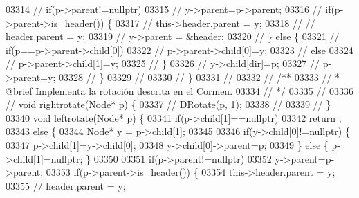 \begin{DoxyCode}
03314 \textcolor{comment}{//                if(p->parent!=nullptr)}
03315 \textcolor{comment}{//                    y->parent=p->parent;}
03316 \textcolor{comment}{//                if(p->parent->is\_header()) \{}
03317 \textcolor{comment}{//                    this->header.parent = y;}
03318 \textcolor{comment}{//                    // header.parent = y;}
03319 \textcolor{comment}{//                    y->parent = &header;}
03320 \textcolor{comment}{//                \} else \{}
03321 \textcolor{comment}{//                    if(p==p->parent->child[0])}
03322 \textcolor{comment}{//                        p->parent->child[0]=y;}
03323 \textcolor{comment}{//                    else}
03324 \textcolor{comment}{//                        p->parent->child[1]=y;}
03325 \textcolor{comment}{//                \}}
03326 \textcolor{comment}{//                y->child[dir]=p;}
03327 \textcolor{comment}{//                p->parent=y;}
03328 \textcolor{comment}{//            \}}
03329 \textcolor{comment}{//}
03330 \textcolor{comment}{//        \}}
03331 \textcolor{comment}{//}
03332 \textcolor{comment}{//        /**}
03333 \textcolor{comment}{//         * @brief Implementa la rotación descrita en el Cormen.}
03334 \textcolor{comment}{//         */}
03335 \textcolor{comment}{//}
03336 \textcolor{comment}{//        void rightrotate(Node* p) \{}
03337 \textcolor{comment}{//            DRotate(p, 1);}
03338 \textcolor{comment}{//}
03339 \textcolor{comment}{//        \}}
\hypertarget{map_8h_source.tex_l03340}{}\hyperlink{classaed2_1_1map_ad764851f1534f2db0964c4f729056a1e_ad764851f1534f2db0964c4f729056a1e}{03340}         \textcolor{keywordtype}{void} \hyperlink{classaed2_1_1map_ad764851f1534f2db0964c4f729056a1e_ad764851f1534f2db0964c4f729056a1e}{leftrotate}(Node* p) \{
03341             \textcolor{keywordflow}{if}(p->child[1]==\textcolor{keyword}{nullptr})
03342                 return ;
03343             \textcolor{keywordflow}{else} \{
03344                 Node* y = p->child[1];
03345 
03346                 \textcolor{keywordflow}{if}(y->child[0]!=\textcolor{keyword}{nullptr}) \{
03347                     p->child[1]=y->child[0];
03348                     y->child[0]->parent=p;
03349                 \} \textcolor{keywordflow}{else} \{ p->child[1]=\textcolor{keyword}{nullptr}; \}
03350 
03351                 \textcolor{keywordflow}{if}(p->parent!=\textcolor{keyword}{nullptr})
03352                     y->parent=p->parent;
03353                 \textcolor{keywordflow}{if}(p->parent->is\_header()) \{
03354                     this->header.parent = y;
03355                     \textcolor{comment}{// header.parent = y;}

\end{DoxyCode}
